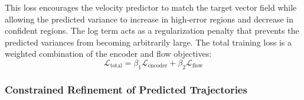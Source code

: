 \documentclass[conference]{IEEEtran}
\begin{document}
This loss encourages the velocity predictor to match the target vector field while allowing the predicted variance to increase in high-error regions and decrease in confident regions. The log term acts as a regularization penalty that prevents the predicted variances from becoming arbitrarily large. The total training loss is a weighted combination of the encoder and flow objectives:
\begin{equation}
\mathcal{L}_{\text{total}} = \beta_1 \mathcal{L}_{\text{encoder}} + \beta_2 \mathcal{L}_{\text{flow}}
\label{eq:total_loss}
\end{equation}

\subsubsection*{Constrained Refinement of Predicted Trajectories}



\end{document}
